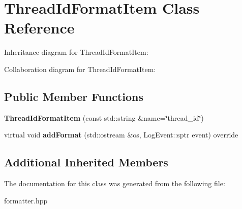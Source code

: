 \hypertarget{classThreadIdFormatItem}{}\section{Thread\+Id\+Format\+Item Class Reference}
\label{classThreadIdFormatItem}


Inheritance diagram for Thread\+Id\+Format\+Item\+:


Collaboration diagram for Thread\+Id\+Format\+Item\+:
\subsection*{Public Member Functions}
\begin{DoxyCompactItemize}
\item 
\mbox{\label{classThreadIdFormatItem_a9d4b5b3715c20bab62878614f65dc9d2}} 
{\bfseries Thread\+Id\+Format\+Item} (const std\+::string \&name=\char`\"{}thread\+\_\+id\char`\"{})
\item 
\mbox{\label{classThreadIdFormatItem_a634a8db2be761b144796f0b58d173987}} 
virtual void {\bfseries add\+Format} (std\+::ostream \&os, Log\+Event\+::sptr event) override
\end{DoxyCompactItemize}
\subsection*{Additional Inherited Members}


The documentation for this class was generated from the following file\+:\begin{DoxyCompactItemize}
\item 
formatter.\+hpp\end{DoxyCompactItemize}
